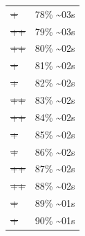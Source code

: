 \documentclass[12pt]{article}
\begin{document}
\begin{center}
\begin{tabular}{ll}
\sout{\sout{\sout{\sout{\sout{\sout{\sout{\sout{\sout{\sout{\sout{\sout{\sout{\sout{\sout{\sout{\sout{\sout{\sout{+}}}}}}}}}}}}}}}}}}} & 78\% \textasciitilde{}03s\\
\sout{\sout{\sout{\sout{\sout{\sout{\sout{\sout{\sout{\sout{\sout{\sout{\sout{\sout{\sout{\sout{\sout{\sout{\sout{++}}}}}}}}}}}}}}}}}}} & 79\% \textasciitilde{}03s\\
\sout{\sout{\sout{\sout{\sout{\sout{\sout{\sout{\sout{\sout{\sout{\sout{\sout{\sout{\sout{\sout{\sout{\sout{\sout{++}}}}}}}}}}}}}}}}}}} & 80\% \textasciitilde{}02s\\
\sout{\sout{\sout{\sout{\sout{\sout{\sout{\sout{\sout{\sout{\sout{\sout{\sout{\sout{\sout{\sout{\sout{\sout{\sout{\sout{+}}}}}}}}}}}}}}}}}}}} & 81\% \textasciitilde{}02s\\
\sout{\sout{\sout{\sout{\sout{\sout{\sout{\sout{\sout{\sout{\sout{\sout{\sout{\sout{\sout{\sout{\sout{\sout{\sout{\sout{+}}}}}}}}}}}}}}}}}}}} & 82\% \textasciitilde{}02s\\
\sout{\sout{\sout{\sout{\sout{\sout{\sout{\sout{\sout{\sout{\sout{\sout{\sout{\sout{\sout{\sout{\sout{\sout{\sout{\sout{++}}}}}}}}}}}}}}}}}}}} & 83\% \textasciitilde{}02s\\
\sout{\sout{\sout{\sout{\sout{\sout{\sout{\sout{\sout{\sout{\sout{\sout{\sout{\sout{\sout{\sout{\sout{\sout{\sout{\sout{++}}}}}}}}}}}}}}}}}}}} & 84\% \textasciitilde{}02s\\
\sout{\sout{\sout{\sout{\sout{\sout{\sout{\sout{\sout{\sout{\sout{\sout{\sout{\sout{\sout{\sout{\sout{\sout{\sout{\sout{\sout{+}}}}}}}}}}}}}}}}}}}}} & 85\% \textasciitilde{}02s\\
\sout{\sout{\sout{\sout{\sout{\sout{\sout{\sout{\sout{\sout{\sout{\sout{\sout{\sout{\sout{\sout{\sout{\sout{\sout{\sout{\sout{+}}}}}}}}}}}}}}}}}}}}} & 86\% \textasciitilde{}02s\\
\sout{\sout{\sout{\sout{\sout{\sout{\sout{\sout{\sout{\sout{\sout{\sout{\sout{\sout{\sout{\sout{\sout{\sout{\sout{\sout{\sout{++}}}}}}}}}}}}}}}}}}}}} & 87\% \textasciitilde{}02s\\
\sout{\sout{\sout{\sout{\sout{\sout{\sout{\sout{\sout{\sout{\sout{\sout{\sout{\sout{\sout{\sout{\sout{\sout{\sout{\sout{\sout{++}}}}}}}}}}}}}}}}}}}}} & 88\% \textasciitilde{}02s\\
\sout{\sout{\sout{\sout{\sout{\sout{\sout{\sout{\sout{\sout{\sout{\sout{\sout{\sout{\sout{\sout{\sout{\sout{\sout{\sout{\sout{\sout{+}}}}}}}}}}}}}}}}}}}}}} & 89\% \textasciitilde{}01s\\
\sout{\sout{\sout{\sout{\sout{\sout{\sout{\sout{\sout{\sout{\sout{\sout{\sout{\sout{\sout{\sout{\sout{\sout{\sout{\sout{\sout{\sout{+}}}}}}}}}}}}}}}}}}}}}} & 90\% \textasciitilde{}01s\\

\end{tabular}
\end{center}
\end{document}
